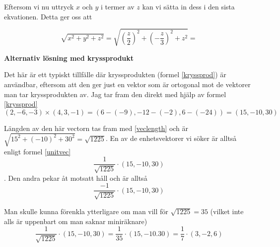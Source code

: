 \documentclass[../../main.tex]{subfiles}
\begin{document}
\begin{solution}{5}
Eftersom vi nu uttryck $x$ och $y$ i termer av $z$ kan vi sätta in dess i den sista ekvationen. 
Detta ger oss att 

$$\sqrt{x^2+y^2+z^2}=\sqrt{(\frac{z}{2})^2+(-\frac{z}{3})^2+z^2}=$$


\bigskip
\textbf{Alternativ lösning med kryssprodukt}

Det här är ett typiskt tillfälle där kryssprodukten (formel \ref{kryssprod}) är användbar, eftersom att den ger just en vektor som är ortogonal mot de vektorer man tar kryssprodukten av. Jag tar fram den direkt med hjälp av formel \ref{kryssprod}
\[(2, -6, -3)\times (4, 3, -1) = (6 - (-9), -12 - (-2), 6 - (-24)) = (15, -10, 30)\]

Längden av den här vectorn tas fram med \ref{veclength} och är \(\sqrt{15^2 + (-10)^2 + 30^2} = \sqrt{1225}\). En av de enhetsvektorer vi söker är alltså enligt formel \ref{unitvec} 
\[\frac{1}{\sqrt{1225}}\cdot(15, -10, 30)\].
Den andra pekar åt motsatt håll och är alltså 
\[\frac{-1}{\sqrt{1225}}\cdot(15, -10, 30)\]

Man skulle kunna förenkla ytterligare om man vill för $\sqrt{1225} = 35$ (vilket inte alls är uppenbart om man saknar miniräknare)
\[\frac{1}{\sqrt{1225}}\cdot(15, -10, 30) = \frac{1}{35}\cdot(15, -10. 30) = \frac{1}{7}\cdot(3, -2, 6)\]
\end{solution}
\end{document}
